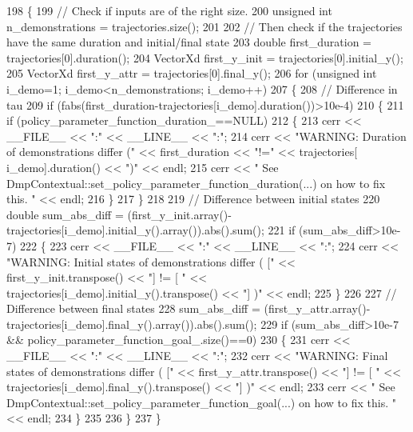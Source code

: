 \begin{DoxyCode}
198 \{
199   \textcolor{comment}{// Check if inputs are of the right size.}
200   \textcolor{keywordtype}{unsigned} \textcolor{keywordtype}{int} n\_demonstrations = trajectories.size();
201   
202   \textcolor{comment}{// Then check if the trajectories have the same duration and initial/final state}
203   \textcolor{keywordtype}{double} first\_duration = trajectories[0].duration();
204   VectorXd first\_y\_init = trajectories[0].initial\_y();
205   VectorXd first\_y\_attr = trajectories[0].final\_y();  
206   \textcolor{keywordflow}{for} (\textcolor{keywordtype}{unsigned} \textcolor{keywordtype}{int} i\_demo=1; i\_demo<n\_demonstrations; i\_demo++)
207   \{
208     \textcolor{comment}{// Difference in tau}
209     \textcolor{keywordflow}{if} (fabs(first\_duration-trajectories[i\_demo].duration())>10e-4)
210       \{
211         \textcolor{keywordflow}{if} (policy\_parameter\_function\_duration\_==NULL) 
212         \{
213           cerr << \_\_FILE\_\_ << \textcolor{stringliteral}{":"} << \_\_LINE\_\_ << \textcolor{stringliteral}{":"};
214           cerr << \textcolor{stringliteral}{"WARNING: Duration of demonstrations differ ("} << first\_duration << \textcolor{stringliteral}{"!="} << trajectories[
      i\_demo].duration() << \textcolor{stringliteral}{")"} << endl;
215           cerr << \textcolor{stringliteral}{"         See DmpContextual::set\_policy\_parameter\_function\_duration(...) on how to fix
       this. "} << endl;
216         \}
217       \}
218     
219     \textcolor{comment}{// Difference between initial states}
220     \textcolor{keywordtype}{double} sum\_abs\_diff = (first\_y\_init.array()-trajectories[i\_demo].initial\_y().array()).abs().sum();
221     \textcolor{keywordflow}{if} (sum\_abs\_diff>10e-7)
222     \{
223       cerr << \_\_FILE\_\_ << \textcolor{stringliteral}{":"} << \_\_LINE\_\_ << \textcolor{stringliteral}{":"};
224       cerr << \textcolor{stringliteral}{"WARNING: Initial states of demonstrations differ ( ["} << first\_y\_init.transpose() << \textcolor{stringliteral}{"] != [
       "} << trajectories[i\_demo].initial\_y().transpose() << \textcolor{stringliteral}{"] )"} << endl;
225     \}
226     
227     \textcolor{comment}{// Difference between final states}
228     sum\_abs\_diff = (first\_y\_attr.array()-trajectories[i\_demo].final\_y().array()).abs().sum();
229     \textcolor{keywordflow}{if} (sum\_abs\_diff>10e-7 && policy\_parameter\_function\_goal\_.size()==0)
230     \{
231       cerr << \_\_FILE\_\_ << \textcolor{stringliteral}{":"} << \_\_LINE\_\_ << \textcolor{stringliteral}{":"};
232       cerr << \textcolor{stringliteral}{"WARNING: Final states of demonstrations differ ( ["} << first\_y\_attr.transpose() << \textcolor{stringliteral}{"] != [ "}
       << trajectories[i\_demo].final\_y().transpose() << \textcolor{stringliteral}{"] )"} << endl;
233       cerr << \textcolor{stringliteral}{"         See DmpContextual::set\_policy\_parameter\_function\_goal(...) on how to fix this. "} <<
       endl;
234     \}
235     
236   \}
237 \}
\end{DoxyCode}


